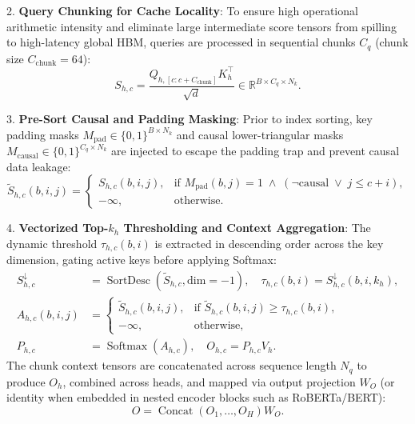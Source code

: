 2. \textbf{Query Chunking for Cache Locality}: To ensure high operational arithmetic intensity and eliminate large intermediate score tensors from spilling to high-latency global HBM, queries are processed in sequential chunks $C_q$ (chunk size $C_{\text{chunk}} = 64$):
\begin{equation}
S_{h, c} = \frac{Q_{h, [c : c + C_{\text{chunk}}]} K_h^\top}{\sqrt{d}} \in \mathbb{R}^{B \times C_q \times N_k}.
\end{equation}

3. \textbf{Pre-Sort Causal and Padding Masking}: Prior to index sorting, key padding masks $M_{\text{pad}} \in \{0, 1\}^{B \times N_k}$ and causal lower-triangular masks $M_{\text{causal}} \in \{0, 1\}^{C_q \times N_k}$ are injected to escape the padding trap and prevent causal data leakage:
\begin{equation}
\widetilde{S}_{h, c}(b, i, j) = \begin{cases}
S_{h, c}(b, i, j), & \text{if } M_{\text{pad}}(b, j) = 1 \;\wedge\; (\neg\text{causal} \;\vee\; j \le c + i), \\
-\infty, & \text{otherwise}.
\end{cases}
\end{equation}

4. \textbf{Vectorized Top-$k_h$ Thresholding and Context Aggregation}: The dynamic threshold $\tau_{h, c}(b, i)$ is extracted in descending order across the key dimension, gating active keys before applying Softmax:
\begin{align}
S^{\downarrow}_{h, c} &= \operatorname{SortDesc}(\widetilde{S}_{h, c}, \text{dim}=-1), \quad \tau_{h, c}(b, i) = S^{\downarrow}_{h, c}(b, i, k_h), \\
A_{h, c}(b, i, j) &= \begin{cases}
\widetilde{S}_{h, c}(b, i, j), & \text{if } \widetilde{S}_{h, c}(b, i, j) \ge \tau_{h, c}(b, i), \\
-\infty, & \text{otherwise},
\end{cases} \\
P_{h, c} &= \operatorname{Softmax}\left(A_{h, c}\right), \quad O_{h, c} = P_{h, c} V_h.
\end{align}
The chunk context tensors are concatenated across sequence length $N_q$ to produce $O_h$, combined across heads, and mapped via output projection $W_O$ (or identity when embedded in nested encoder blocks such as RoBERTa/BERT):
\begin{equation}
O = \operatorname{Concat}(O_1, \dots, O_H) W_O.
\end{equation}


